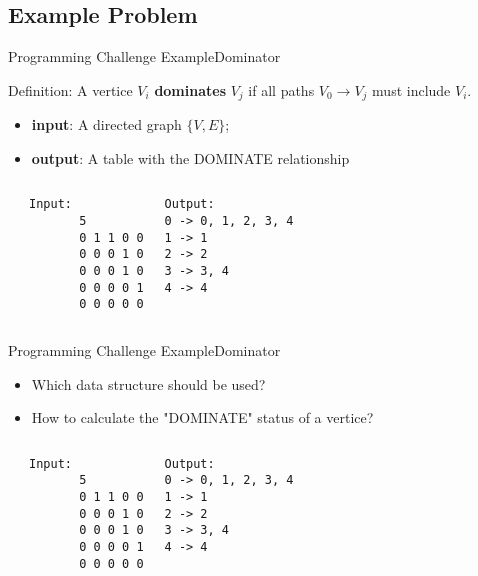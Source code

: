 \subsection{Example Problem}

\begin{frame}[fragile]{Programming Challenge Example}{Dominator}
  \begin{block}{}
    Definition: A vertice $V_i$ {\bf dominates} $V_j$ if all paths $V_0 \to V_j$ must include $V_i$.
    \begin{itemize}
      \item {\bf input}: A directed graph $\{V,E\}$;
      \item {\bf output}: A table with the DOMINATE relationship
    \end{itemize}
  \end{block}
\begin{columns}[T]
    \begin{center}
      
    \end{center}
\begin{verbatim}
Input:
       5
       0 1 1 0 0
       0 0 0 1 0
       0 0 0 1 0
       0 0 0 0 1
       0 0 0 0 0
\end{verbatim}
{\smaller
\begin{verbatim}
Output:
0 -> 0, 1, 2, 3, 4
1 -> 1
2 -> 2
3 -> 3, 4
4 -> 4
\end{verbatim}}
  \end{columns}
\end{frame}

\begin{frame}[fragile]{Programming Challenge Example}{Dominator}
  \begin{block}{}
    \begin{itemize}
      \item Which data structure should be used?
      \item How to calculate the "DOMINATE" status of a vertice?
    \end{itemize}
  \end{block}
  \begin{columns}[T]
      \begin{center}
        
      \end{center}
\begin{verbatim}
Input:
       5
       0 1 1 0 0
       0 0 0 1 0
       0 0 0 1 0
       0 0 0 0 1
       0 0 0 0 0
\end{verbatim}
{\smaller
\begin{verbatim}
Output:
0 -> 0, 1, 2, 3, 4
1 -> 1
2 -> 2
3 -> 3, 4
4 -> 4
\end{verbatim}}
    \end{columns}
\end{frame}

